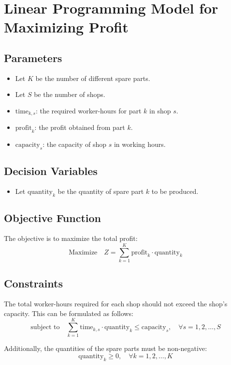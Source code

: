 \documentclass{article}
\begin{document}
\section*{Linear Programming Model for Maximizing Profit}

\subsection*{Parameters}
\begin{itemize}
    \item Let \( K \) be the number of different spare parts.
    \item Let \( S \) be the number of shops.
    \item \( \text{time}_{k,s} \): the required worker-hours for part \( k \) in shop \( s \).
    \item \( \text{profit}_{k} \): the profit obtained from part \( k \).
    \item \( \text{capacity}_{s} \): the capacity of shop \( s \) in working hours.
\end{itemize}

\subsection*{Decision Variables}
\begin{itemize}
    \item Let \( \text{quantity}_{k} \) be the quantity of spare part \( k \) to be produced.
\end{itemize}

\subsection*{Objective Function}
The objective is to maximize the total profit:
\[
\text{Maximize} \quad Z = \sum_{k=1}^{K} \text{profit}_{k} \cdot \text{quantity}_{k}
\]

\subsection*{Constraints}
The total worker-hours required for each shop should not exceed the shop's capacity. This can be formulated as follows:
\[
\text{subject to} \quad \sum_{k=1}^{K} \text{time}_{k,s} \cdot \text{quantity}_{k} \leq \text{capacity}_{s}, \quad \forall s = 1,2,\ldots,S
\]

Additionally, the quantities of the spare parts must be non-negative:
\[
\text{quantity}_{k} \geq 0, \quad \forall k = 1,2,\ldots,K
\]
\end{document}
